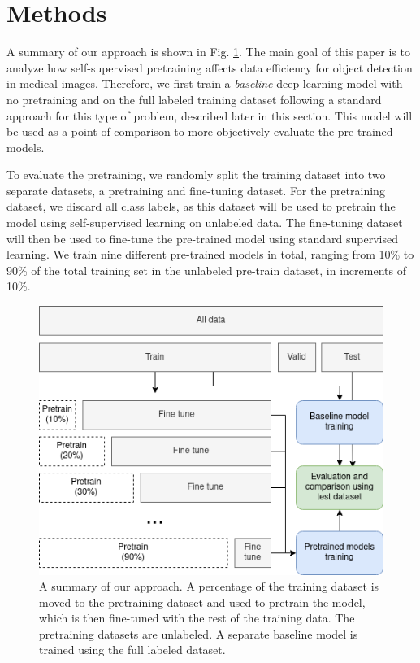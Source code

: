 \documentclass[conference]{IEEEtran}
\begin{document}
\section{Methods}

A summary of our approach is shown in Fig. \ref{fig:dataset-split-summary}. 
The main goal of this paper is to analyze how self-supervised pretraining affects data efficiency for object detection 
in medical images. Therefore, we first train a \textit{baseline} deep learning model with no pretraining and on the full labeled 
training dataset following a standard approach for this type of problem, described later in this section. 
This model will be used as a point of comparison to more objectively evaluate the pre-trained models.

To evaluate the pretraining, we randomly split the training dataset into two separate datasets, a pretraining and fine-tuning 
dataset. For the pretraining dataset, we discard all class labels, as this dataset will be used to pretrain the model using 
self-supervised learning on unlabeled data. The fine-tuning dataset will then be used to fine-tune the pre-trained model using 
standard supervised learning. We train nine different pre-trained models in total, ranging from 10\% to 90\% of the total 
training set in the unlabeled pre-train dataset, in increments of 10\%.

\begin{figure}[t]
\centering
\includegraphics[width=\columnwidth]{images/dataset-split-summary}
\caption{A summary of our approach. A percentage of the training dataset is moved to the pretraining dataset and used to pretrain the model, which is then fine-tuned with the rest of the training data. The pretraining datasets are unlabeled. A separate baseline model is trained using the full labeled dataset.}
\label{fig:dataset-split-summary}
\end{figure}
\end{document}
